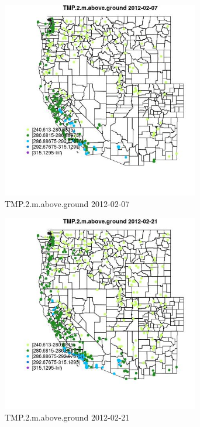 \begin{figure} 
\centering  
\includegraphics[width=0.77\textwidth]{Code_Outputs/Report_ML_input_PM25_Step4_part_f_de_duplicated_aveswNAs_MapObsTMP2maboveground2012-02-07.jpg} 
\caption{\label{fig:Report_ML_input_PM25_Step4_part_f_de_duplicated_aveswNAsMapObsTMP2maboveground2012-02-07}TMP.2.m.above.ground 2012-02-07} 
\end{figure} 
 

\begin{figure} 
\centering  
\includegraphics[width=0.77\textwidth]{Code_Outputs/Report_ML_input_PM25_Step4_part_f_de_duplicated_aveswNAs_MapObsTMP2maboveground2012-02-21.jpg} 
\caption{\label{fig:Report_ML_input_PM25_Step4_part_f_de_duplicated_aveswNAsMapObsTMP2maboveground2012-02-21}TMP.2.m.above.ground 2012-02-21} 
\end{figure} 
 


